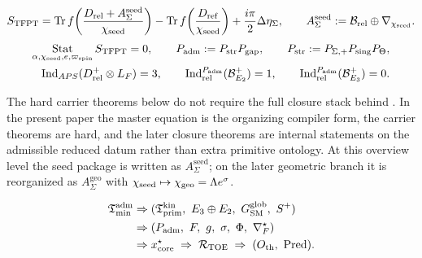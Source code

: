 \begin{tcolorbox}[colback=tfptblue!3, colframe=tfptblue, breakable,
    title={TFPT master equation and selectors}, colbacktitle=tfptblue]
\begin{equation}
\label{eq:tfpt-master}
\begin{aligned}
S_{\mathrm{TFPT}}
=
\operatorname{Tr}f\!\left(\frac{D_{\mathrm{rel}}+A_{\Sigma}^{\mathrm{seed}}}{\chi_{\mathrm{seed}}}\right)
-
\operatorname{Tr}f\!\left(\frac{D_{\mathrm{ref}}}{\chi_{\mathrm{seed}}}\right)
+\frac{i\pi}{2}\Delta\eta_\Sigma,
\qquad
A_{\Sigma}^{\mathrm{seed}}:=\mathcal B_{\mathrm{rel}}\oplus\nabla_{\chi_{\mathrm{seed}}}.
\end{aligned}
\end{equation}
\begin{equation}
\label{eq:tfpt-selectors}
\begin{aligned}
\operatorname*{Stat}_{\alpha,\chi_{\mathrm{seed}},e,\varpi_{\mathrm{spin}}}S_{\mathrm{TFPT}}=0,
\qquad
P_{\mathrm{adm}}:=P_{\mathrm{str}}P_{\mathrm{gap}},
\qquad
P_{\mathrm{str}}:=P_{\Sigma,+}P_{\mathrm{sing}}P_\Theta,
\\
\operatorname{Ind}_{APS}(D^+_{\mathrm{rel}}\otimes L_F)=3,
\qquad
\operatorname{Ind}^{P_{\mathrm{adm}}}_{\mathrm{rel}}(\mathcal B^+_{E_2})=1,
\qquad
\operatorname{Ind}^{P_{\mathrm{adm}}}_{\mathrm{rel}}(\mathcal B^+_{E_3})=0.
\end{aligned}
\end{equation}
\end{tcolorbox}

The hard carrier theorems below do not require the full closure stack behind
. In the present paper the master equation is the
organizing compiler form, the carrier theorems are hard, and the later closure theorems are
internal statements on the admissible reduced datum rather than extra primitive ontology. At this
overview level the seed package is written as $A_{\Sigma}^{\mathrm{seed}}$; on the later
geometric branch it is reorganized as $A_{\Sigma}^{\mathrm{geo}}$ with
$\chi_{\mathrm{seed}}\mapsto\chi_{\mathrm{geo}}=\Lambda e^\sigma$.

\begin{tcolorbox}[colback=tfptblue!3, colframe=tfptblue, breakable,
    title={Closed TFPT Chain}, colbacktitle=tfptblue]
\begin{equation}
\label{eq:compiler-chain}
\begin{aligned}
\Tmin^{\mathrm{adm}}
&\Rightarrow
( \Tprim^{\mathrm{kin}},\ E_3\oplus E_2,\ G_{\SM}^{\mathrm{glob}},\ S^+)\\
&\Rightarrow
( \Padm,\ F,\ g,\ \sigma,\ \Phi,\ \nabla_F^\star )\\
&\Rightarrow
x_{\mathrm{core}}^\star
\;\Rightarrow\;
\mathcal R_{\mathrm{TOE}}
\;\Rightarrow\;
(O_{\mathrm{th}},\ \Pred).
\end{aligned}
\end{equation}
\end{tcolorbox}

